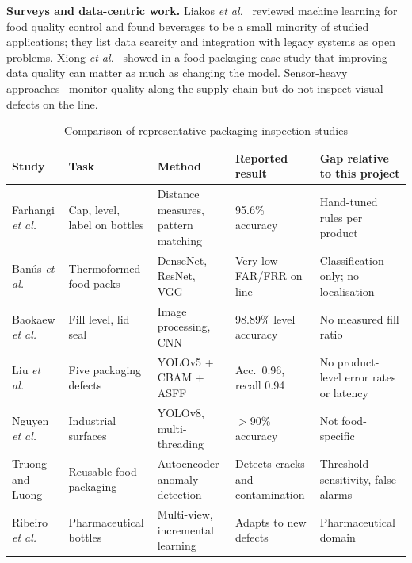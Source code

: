 \noindent\textbf{Surveys and data-centric work.} Liakos \textit{et al.}~\cite{liakos2025} reviewed machine learning for food quality control and found beverages to be a small minority of studied applications; they list data scarcity and integration with legacy systems as open problems. Xiong \textit{et al.}~\cite{xiong2024} showed in a food-packaging case study that improving data quality can matter as much as changing the model. Sensor-heavy approaches~\cite{krishnan2024,cao2025,du2025} monitor quality along the supply chain but do not inspect visual defects on the line.

\begin{table}[htbp]
\centering
\caption{Comparison of representative packaging-inspection studies}
\label{tab:lit-compare}
\footnotesize
\begin{tabularx}{\textwidth}{|L{2.6cm}|L{2.4cm}|L{2.6cm}|L{2.4cm}|X|}
\hline
\textbf{Study} & \textbf{Task} & \textbf{Method} & \textbf{Reported result} & \textbf{Gap relative to this project} \\ \hline
Farhangi \textit{et al.}~\cite{farhangi2024} & Cap, level, label on bottles & Distance measures, pattern matching & 95.6\% accuracy & Hand-tuned rules per product \\ \hline
Ban\'us \textit{et al.}~\cite{banus2021} & Thermoformed food packs & DenseNet, ResNet, VGG & Very low FAR/FRR on line & Classification only; no localisation \\ \hline
Baokaew \textit{et al.}~\cite{chatchapol2024} & Fill level, lid seal & Image processing, CNN & 98.89\% level accuracy & No measured fill ratio \\ \hline
Liu \textit{et al.}~\cite{liu2025} & Five packaging defects & YOLOv5 + CBAM + ASFF & Acc.\ 0.96, recall 0.94 & No product-level error rates or latency \\ \hline
Nguyen \textit{et al.}~\cite{nguyen2025} & Industrial surfaces & YOLOv8, multi-threading & $>$90\% accuracy & Not food-specific \\ \hline
Truong and Luong~\cite{truong2024} & Reusable food packaging & Autoencoder anomaly detection & Detects cracks and contamination & Threshold sensitivity, false alarms \\ \hline
Ribeiro \textit{et al.}~\cite{ribeiro2025} & Pharmaceutical bottles & Multi-view, incremental learning & Adapts to new defects & Pharmaceutical domain \\ \hline
\end{tabularx}
\end{table}

